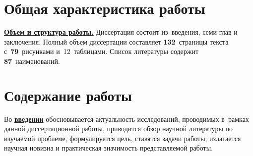 \section*{Общая характеристика работы}

\newcommand{\actuality}{\underline{\textbf{\actualityTXT}}}
\newcommand{\progress}{\underline{\textbf{\progressTXT}}}
\newcommand{\aim}{\underline{{\textbf\aimTXT}}}
\newcommand{\tasks}{\underline{\textbf{\tasksTXT}}}
\newcommand{\novelty}{\underline{\textbf{\noveltyTXT}}}
\newcommand{\influence}{\underline{\textbf{\influenceTXT}}}
\newcommand{\methods}{\underline{\textbf{\methodsTXT}}}
\newcommand{\defpositions}{\underline{\textbf{\defpositionsTXT}}}
\newcommand{\reliability}{\underline{\textbf{\reliabilityTXT}}}
\newcommand{\probation}{\underline{\textbf{\probationTXT}}}
\newcommand{\contribution}{\underline{\textbf{\contributionTXT}}}
\newcommand{\publications}{\underline{\textbf{\publicationsTXT}}}




\underline{\textbf{Объем и структура работы.}} Диссертация состоит из~введения,
семи глав и заключения. Полный объем диссертации составляет
\textbf{132}~страницы текста с~\textbf{79}~рисунками и~12~таблицами. Список
литературы содержит \textbf{87}~наименований.



\section*{Содержание работы}
Во \underline{\textbf{введении}} обосновывается актуальность
исследований, проводимых в~рамках данной диссертационной работы,
приводится обзор научной литературы по изучаемой проблеме,
формулируется цель, ставятся задачи работы, излагается научная новизна
и практическая значимость представляемой работы. %


